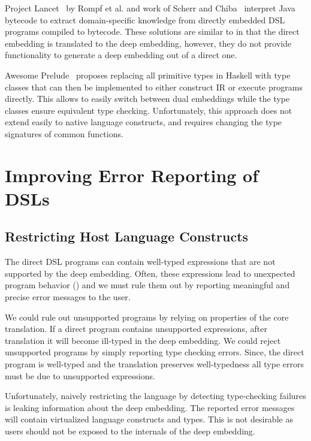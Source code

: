 Project Lancet~\cite{lancet} by Rompf et al. and work of Scherr and
Chiba~\cite{scherr_ecoop_2014} interpret Java bytecode to extract
domain-specific knowledge from directly embedded
DSL programs compiled to bytecode. These solutions are similar to \yy
in that the direct embedding is translated to the deep
embedding, however, they do not provide functionality to
generate a deep embedding out of a direct one.

Awesome Prelude~\cite{awesome} proposes replacing all primitive types
in Haskell with type classes that can then be implemented to either
construct IR or execute programs directly. This allows to easily
switch between dual embeddings while the type classes ensure
equivalent type checking.  Unfortunately, this approach does not
extend easily to native language constructs, and requires changing the
type signatures of common functions.

\chapter{Improving Error Reporting of DSLs}
\label{sec:error-reporting}

\section{Restricting Host Language Constructs}
\label{sec:restricting}

The direct DSL programs can contain well-typed expressions that are not
supported by the deep embedding. Often, these expressions lead to unexpected program
behavior () and we must rule them out by reporting meaningful and
precise error messages to the user.

We could rule out unsupported programs by relying on properties of the
core translation. If a direct program contains unsupported expressions, after
translation it will become ill-typed in the deep embedding. We could reject
unsupported programs by simply reporting type checking errors. Since, the
direct program is well-typed and the translation preserves well-typedness all
type errors must be due to unsupported expressions.

Unfortunately, naively restricting the language by detecting type-checking
failures is leaking information about the deep embedding. The reported error
messages will contain virtualized language constructs and types. This is not desirable
as users should not be exposed to the internals of the deep embedding.

